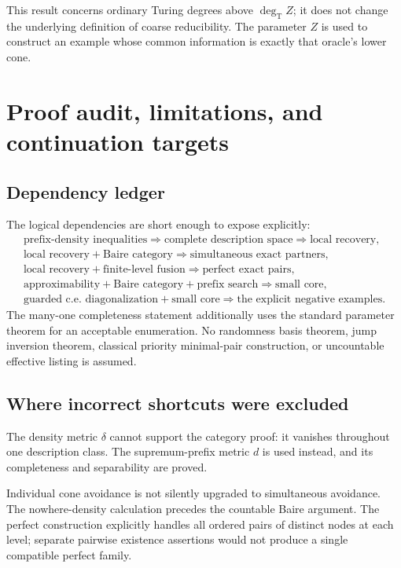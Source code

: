 \documentclass[11pt,a4paper]{article}
\newcommand{\degT}{\operatorname{deg}_{\mathrm T}}
\theoremstyle{definition}\newtheorem{definition}[theorem]{Definition}
\theoremstyle{remark}\newtheorem{remark}[theorem]{Remark}
\begin{document}
This result concerns ordinary Turing degrees above $\degT Z$; it does not
change the underlying definition of coarse reducibility. The parameter $Z$
is used to construct an example whose common information is exactly that
oracle's lower cone.

\section{Proof audit, limitations, and continuation targets}
\label{sec:audit}
\subsection{Dependency ledger}
The logical dependencies are short enough to expose explicitly:
\[
\begin{gathered}
 \text{prefix-density inequalities}
 \Longrightarrow \text{complete description space}
 \Longrightarrow \text{local recovery},\\
 \text{local recovery}+\text{Baire category}
 \Longrightarrow \text{simultaneous exact partners},\\
 \text{local recovery}+\text{finite-level fusion}
 \Longrightarrow \text{perfect exact pairs},\\
 \text{approximability}+\text{Baire category}+\text{prefix search}
 \Longrightarrow \text{small core},\\
 \text{guarded c.e. diagonalization}+\text{small core}
 \Longrightarrow \text{the explicit negative examples}.
\end{gathered}
\]
The many-one completeness statement additionally uses the standard parameter
 theorem for an acceptable enumeration. No randomness basis theorem, jump
inversion theorem, classical priority minimal-pair construction, or
uncountable effective listing is assumed.

\subsection{Where incorrect shortcuts were excluded}
The density metric $\delta$ cannot support the category proof: it vanishes
throughout one description class. The supremum-prefix metric $d$ is used
instead, and its completeness and separability are proved.

Individual cone avoidance is not silently upgraded to simultaneous avoidance.
The nowhere-density calculation precedes the countable Baire argument. The
perfect construction explicitly handles all ordered pairs of distinct nodes
at each level; separate pairwise existence assertions would not produce a
single compatible perfect family.
\end{document}

